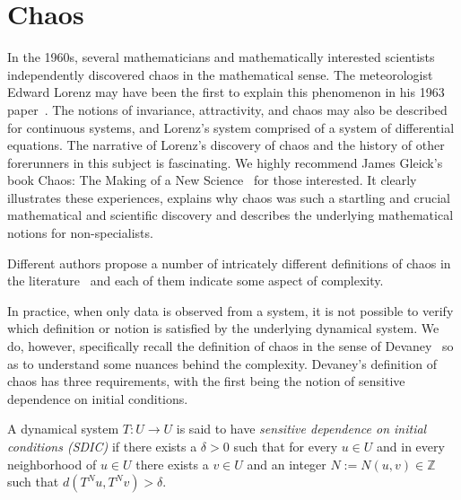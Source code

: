 
\section{Chaos}

In the 1960s, several mathematicians and mathematically interested scientists independently discovered chaos in the mathematical sense. The meteorologist Edward Lorenz may have been the first to explain this phenomenon in his 1963 paper~\cite{lorenz1963deterministic}. The notions of invariance, attractivity, and chaos may also be described for continuous systems, and Lorenz's system comprised of a system of differential equations. 
The narrative of Lorenz's discovery of chaos and the history of other forerunners in this subject is fascinating. We highly recommend James Gleick's book Chaos: The Making of a New Science~\cite{gleick2008chaos} for those interested. It clearly illustrates these experiences, explains why chaos was such a startling and crucial mathematical and scientific discovery and describes the underlying mathematical notions for non-specialists.

Different authors propose a number of intricately different definitions of chaos in the literature~\cite{RasbandChaos, TaborChaos, WigginsChaos} and each of them indicate some aspect of complexity.

In practice, when only data is observed from a system, it is not possible to verify which definition or notion is satisfied by the underlying dynamical system. We do, however, specifically recall the definition of chaos in the sense of Devaney~\cite{devaney2018introduction,de2013elements} so as to understand some nuances behind the complexity. Devaney's definition of chaos has three requirements, with the first being the notion  of sensitive dependence on initial conditions. 

\begin{Definition}
  \label{Dfn_SDIC}\rm
A dynamical system $T: U \to U$ is said to have \textit{sensitive dependence on initial conditions (SDIC)} if there exists a $\delta > 0$ such that for every $u \in U$ and in every neighborhood of $u \in U$ there exists a $v\in{U}$ and an integer $N:=N{(u,v)}\in\mathbb{Z}$ such that $d(T^Nu,T^Nv)>\delta$. 	
\end{Definition}


